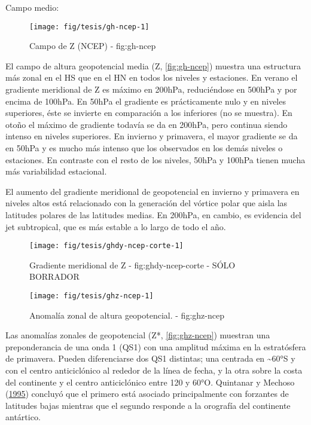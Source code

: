 \documentclass[spanish,a4paper]{book}
\begin{document}
Campo medio:

\begin{figure}

{\centering \texttt{[image: fig/tesis/gh-ncep-1]} 

}

\caption{Campo de Z (NCEP) - fig:gh-ncep}\label{fig:gh-ncep}
\end{figure}

El campo de altura geopotencial media (Z, \autoref{fig:gh-ncep}) muestra
una estructura más zonal en el HS que en el HN en todos los niveles y
estaciones. En verano el gradiente meridional de Z es máximo en 200hPa,
reduciéndose en 500hPa y por encima de 100hPa. En 50hPa el gradiente es
prácticamente nulo y en niveles superiores, éste se invierte en
comparación a los inferiores (no se muestra). En otoño el máximo de
gradiente todavía se da en 200hPa, pero continua siendo intenso en
niveles superiores. En invierno y primavera, el mayor gradiente se da en
50hPa y es mucho más intenso que los observados en los demás niveles o
estaciones. En contraste con el resto de los niveles, 50hPa y 100hPa
tienen mucha más variabilidad estacional.

El aumento del gradiente meridional de geopotencial en invierno y
primavera en niveles altos está relacionado con la generación del
vórtice polar que aisla las latitudes polares de las latitudes medias.
En 200hPa, en cambio, es evidencia del jet subtropical, que es más
estable a lo largo de todo el año.

\begin{figure}
\texttt{[image: fig/tesis/ghdy-ncep-corte-1]} \caption{Gradiente meridional de Z - fig:ghdy-ncep-corte - SÓLO BORRADOR}\label{fig:ghdy-ncep-corte}
\end{figure}

\begin{figure}

{\centering \texttt{[image: fig/tesis/ghz-ncep-1]} 

}

\caption{Anomalía zonal de altura geopotencial. - fig:ghz-ncep}\label{fig:ghz-ncep}
\end{figure}

Las anomalías zonales de geopotencial (Z*, \autoref{fig:ghz-ncep})
muestran una preponderancia de una onda 1 (QS1) con una amplitud máxima
en la estratósfera de primavera. Pueden diferenciarse dos QS1 distintas;
una centrada en \textasciitilde{}60°S y con el centro anticiclónico al
rededor de la línea de fecha, y la otra sobre la costa del continente y
el centro anticiclónico entre 120 y 60°O. Quintanar y Mechoso
(\protect\hyperlink{ref-Quintanar1995}{1995}) concluyó que el primero
está asociado principalmente con forzantes de latitudes bajas mientras
que el segundo responde a la orografía del continente antártico.
\end{document}
